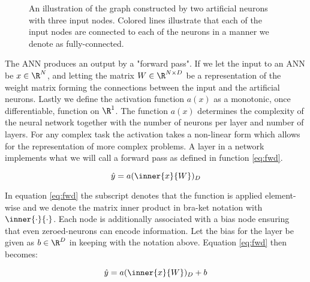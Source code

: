 \begin{figure}[h]
\caption{An illustration of the graph constructed by two artificial neurons with three input nodes. Colored lines illustrate that  each of the input nodes are connected to each of the neurons in a manner we denote as fully-connected.}\label{fig:ann_illustration}
\end{figure}


\noindent The ANN produces an output by a "forward pass". If we let the input to an ANN be $x \in \R^N$, and letting the matrix $W \in \R^{N \times D}$ be a representation of the weight matrix forming the connections between the input and the artificial neurons. Lastly we define the activation function $a(x)$ as a monotonic, once differentiable, function on $\R^1$. The function $a(x)$ determines the complexity of the neural network together with the number of neurons per layer and number of layers. For any complex task the activation takes a non-linear form which allows for the representation of more complex problems. A layer in a network implements what we will call a forward pass as defined in function \ref{eq:fwd}.

\begin{equation}\label{eq:fwd}
	\hat{y} = a(\inner{x}{W})_D
\end{equation}

\noindent In equation \ref{eq:fwd} the subscript denotes that the function is applied element-wise and we denote the matrix inner product in bra-ket notation with $\inner{\cdot}{\cdot}$. Each node is additionally associated with a bias node ensuring that even zeroed-neurons can encode information. Let the bias for the layer be given as $b \in \R^D$ in keeping with the notation above. Equation \ref{eq:fwd} then becomes:

\begin{equation}\label{eq:fwd_b}
	\hat{y} = a(\inner{x}{W})_D + b
\end{equation}


